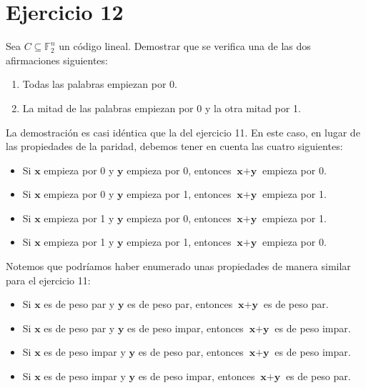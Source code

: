 \section{Ejercicio 12}

\begin{formulationBox}
	Sea $C \subseteq \mathbb{F}_2^n$ un código lineal. Demostrar que se verifica una de las dos afirmaciones siguientes:
	\begin{enumerate}[label=\alph*)]
		\item Todas las palabras empiezan por 0.
		\item La mitad de las palabras empiezan por 0 y la otra mitad por 1.
	\end{enumerate}
\end{formulationBox}

La demostración es casi idéntica que la del ejercicio 11. En este caso, en lugar de las propiedades de la paridad, debemos tener en cuenta las cuatro siguientes:

\begin{itemize}
	\item Si $\textbf{x}$ empieza por 0 y $\textbf{y}$ empieza por 0, entonces $\textbf{x}+\textbf{y}$ empieza por 0.
	\item Si $\textbf{x}$ empieza por 0 y $\textbf{y}$ empieza por 1, entonces $\textbf{x}+\textbf{y}$ empieza por 1.
	\item Si $\textbf{x}$ empieza por 1 y $\textbf{y}$ empieza por 0, entonces $\textbf{x}+\textbf{y}$ empieza por 1.
	\item Si $\textbf{x}$ empieza por 1 y $\textbf{y}$ empieza por 1, entonces $\textbf{x}+\textbf{y}$ empieza por 0.
\end{itemize}

Notemos que podríamos haber enumerado unas propiedades de manera similar para el ejercicio 11:

\begin{itemize}
	\item Si $\textbf{x}$ es de peso par y $\textbf{y}$ es de peso par, entonces $\textbf{x}+\textbf{y}$ es de peso par.
	\item Si $\textbf{x}$ es de peso par y $\textbf{y}$ es de peso impar, entonces $\textbf{x}+\textbf{y}$ es de peso impar.
	\item Si $\textbf{x}$ es de peso impar y $\textbf{y}$ es de peso par, entonces $\textbf{x}+\textbf{y}$ es de peso impar.
	\item Si $\textbf{x}$ es de peso impar y $\textbf{y}$ es de peso impar, entonces $\textbf{x}+\textbf{y}$ es de peso par.
\end{itemize}

